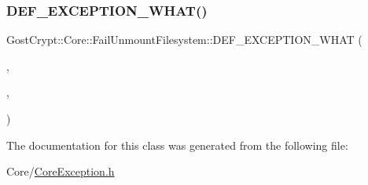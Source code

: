 \subsubsection{\texorpdfstring{D\+E\+F\+\_\+\+E\+X\+C\+E\+P\+T\+I\+O\+N\+\_\+\+W\+H\+A\+T()}{DEF\_EXCEPTION\_WHAT()}}
{\footnotesize\ttfamily Gost\+Crypt\+::\+Core\+::\+Fail\+Unmount\+Filesystem\+::\+D\+E\+F\+\_\+\+E\+X\+C\+E\+P\+T\+I\+O\+N\+\_\+\+W\+H\+AT (\begin{DoxyParamCaption}\item[{\hyperlink{class_gost_crypt_1_1_core_1_1_fail_unmount_filesystem}{Fail\+Unmount\+Filesystem}}]{,  }\item[{\hyperlink{class_gost_crypt_1_1_core_1_1_mount_filesystem_manager_exception}{Mount\+Filesystem\+Manager\+Exception}}]{,  }\item[{\char`\"{}Unable to unmount filesystem in \char`\"{}+mountpoint.\+absolute\+File\+Path()+\char`\"{}(\char`\"{}+Q\+String(strerror(\hyperlink{class_gost_crypt_1_1_core_1_1_mount_filesystem_manager_exception_a1fb5da5dbf91cfd3e664ffb9e2aee9ee}{error\+Number}))+\char`\"{})\textbackslash{}}]{ }\end{DoxyParamCaption})}



The documentation for this class was generated from the following file\+:\begin{DoxyCompactItemize}
\item 
Core/\hyperlink{_core_exception_8h}{Core\+Exception.\+h}\end{DoxyCompactItemize}
